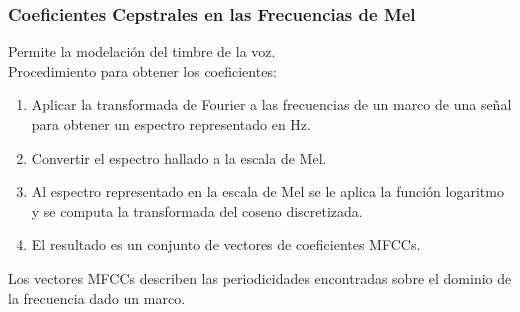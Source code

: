 \documentclass[
10pt, %
aspectratio=169, %
]{beamer}
\begin{document}
	\begin{frame}
		
		\frametitle{Coeficientes Cepstrales en las Frecuencias de Mel}
		
		Permite la modelación del timbre de la voz. \\[5mm]

		Procedimiento para obtener los coeficientes:
		\begin{enumerate}
			\item Aplicar la transformada de Fourier a las frecuencias de un marco de una señal para obtener un espectro representado en Hz.
			
			\item Convertir el espectro hallado a la escala de Mel.
			
			\item Al espectro representado en la escala de Mel se le aplica la función logaritmo y se computa la transformada del coseno discretizada.
			
			\item El resultado es un conjunto de vectores de coeficientes MFCCs.\\[4mm]
		\end{enumerate} 
		
		\pause
		Los vectores MFCCs describen las periodicidades encontradas sobre el dominio de la frecuencia dado un marco. 

	
	\end{frame}
	
\end{document}
